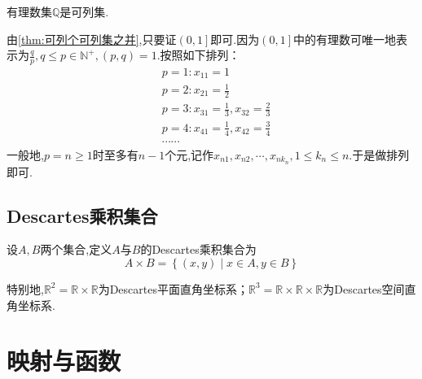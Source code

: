 \begin{formal}
    \begin{theorem}[有理数集可列]\label{thm:有理数集可列}
        有理数集$\mathbb{Q}$是可列集.
    \end{theorem}
    \begin{Proof}
        由\cref{thm:可列个可列集之并},只要证$\left(0,1\right]$即可.因为$\left(0,1\right]$中的有理数可唯一地表示为$\displaystyle
        \frac{q}{p},q\leqslant p\in \mathbb{N}^+,\left(p,q\right)=1$.按照如下排列：
        \begin{align*}
            &p=1:x_{11}=1\\
            &p=2:x_{21}=\frac{1}{2}\\
            &p=3:x_{31}=\frac{1}{3},x_{32}=\frac{2}{3}\\
            &p=4:x_{41}=\frac{1}{4},x_{42}=\frac{3}{4}\\
            &\cdots\cdots
        \end{align*}一般地,$p=n\geqslant 1$时至多有$n-1$个元,记作$x_{n1},x_{n2},\cdots,x_{nk_n},1\leqslant k_n\leqslant n.$于是做排列即可.
    \end{Proof}
\end{formal}
\subsection{Descartes乘积集合}
\begin{formal}
    \begin{definition}[Descartes乘积集合的定义]\label{def:Descartes乘积集合的定义}
        设$A,B$两个集合,定义$A$与$B$的\textup{Descartes}乘积集合为\[
        A\times B=\left\{
            \left( x,y \right)\mid x\in A,y\in B
        \right\}
        \]
    \end{definition}
\end{formal}
\begin{brown}
    \begin{example}
        特别地,$\mathbb{R}^2=\mathbb{R}\times\mathbb{R}$为\textup{Descartes}平面直角坐标系；$\mathbb{R}^3=\mathbb{R}\times\mathbb{R}\times\mathbb{R}$为\textup{Descartes}空间直角坐标系.
    \end{example}
\end{brown}

\newpage
\section{映射与函数}
